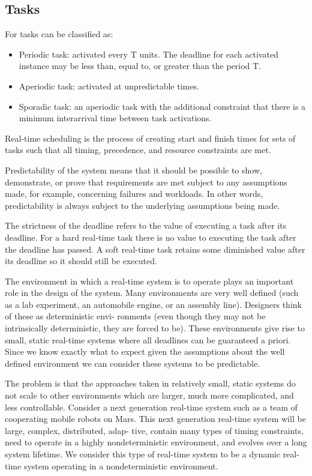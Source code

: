 \documentclass[12pt]{article}
\begin{document}
\subsection{Tasks}

For \cite{stankovic1996real} tasks can be classified as:

\begin{itemize}
  \item Periodic task: activated every T units. The deadline for each activated instance may be less than, equal to, 
or greater than the period T.
  \item Aperiodic task: activated at unpredictable times.
  \item Sporadic task: an aperiodic task with the additional constraint that there is a minimum interarrival time 
between task activations.
\end{itemize}

Real-time scheduling is the process of creating start and finish times for sets of tasks such that
all timing, precedence, and resource constraints are met.

\iffalse

Predictability of the system means that it should be possible to show, demonstrate, or prove that requirements are
met subject to any assumptions made, for example, concerning failures and workloads. In other words, 
predictability is always subject to the underlying assumptions being made.

The strictness of the deadline refers to the value of executing a task after its deadline. For a hard real-time 
task there is no value to executing the task after the deadline has passed. A soft real-time task retains some 
diminished value after its deadline so it should still be executed.

The environment in which a real-time system is to operate plays an important role in the
design of the system. Many environments are very well defined (such as a lab experiment,
an automobile engine, or an assembly line). Designers think of these as deterministic envi-
ronments (even though they may not be intrinsically deterministic, they are forced to be).
These environments give rise to small, static real-time systems where all deadlines can
be guaranteed a priori. Since we know exactly what to expect given the assumptions about the 
well defined environment we can consider these systems to be predictable.

The problem is that the approaches taken in relatively small, static systems do not scale
to other environments which are larger, much more complicated, and less controllable.
Consider a next generation real-time system such as a team of cooperating mobile robots
on Mars. This next generation real-time system will be large, complex, distributed, adap-
tive, contain many types of timing constraints, need to operate in a highly nondeterministic
environment, and evolves over a long system lifetime. We consider this type of real-time system to be
a dynamic real-time system operating in a nondeterministic environment. \cite{stankovic1990predictability}
\end{document}
